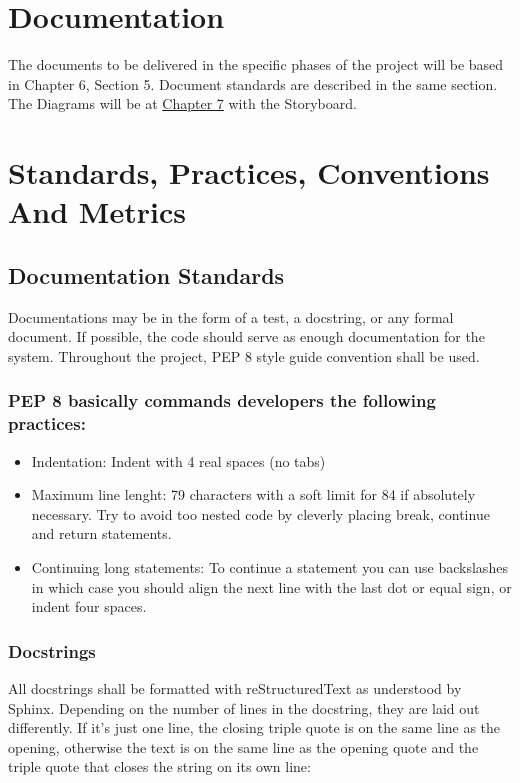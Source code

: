 \documentclass{report}
\begin{document}
\newpage
\section{Documentation}
The documents to be delivered in the specific phases of the project will be based in Chapter 6, Section 5. Document standards are described in the same section. The Diagrams will be at \hyperref[chap:Diagrams]{Chapter 7} with the Storyboard.

\section{Standards, Practices, Conventions And Metrics}
\subsection{Documentation Standards}
Documentations may be in the form of a test, a docstring, or any formal document. If possible, the code should serve as enough documentation for the system. Throughout the project, PEP 8 style guide convention shall be used. 

\subsubsection{PEP 8 basically commands developers the following practices: }
\begin{itemize}
\item Indentation: Indent with 4 real spaces (no tabs)
\item Maximum line lenght: 79 characters with a soft limit for 84 if absolutely necessary. Try to avoid too nested code by cleverly placing break, continue and return statements.
\item Continuing long statements: To continue a statement you can use backslashes in which case you should align the next line with the last dot or equal sign, or indent four spaces.
\end{itemize}

\subsubsection{Docstrings}
All docstrings shall be formatted with reStructuredText as understood by Sphinx. Depending on the number of lines in the docstring, they are laid out differently. If it’s just one line, the closing triple quote is on the same line as the opening, otherwise the text is on the same line as the opening quote and the triple quote that closes the string on its own line:
\end{document}
